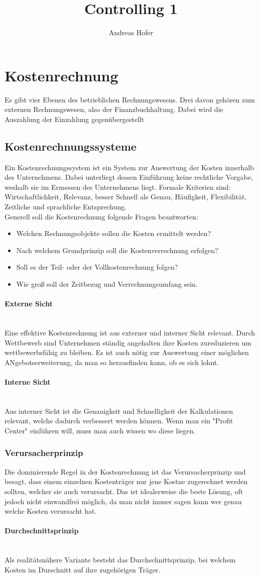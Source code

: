 \documentclass{article}
\title{\vspace{-1cm}Controlling 1}
\author{Andreas Hofer}
\newcommand{\paragraphlb}[1]{\paragraph{#1}\mbox{}\\}
\begin{document}
	\maketitle
	\tableofcontents
	\section{Kostenrechnung}
	Es gibt vier Ebenen des betrieblichen Rechnungswesens. Drei davon gehören zum externen Rechnungswesen, also der Finanzbuchhaltung. Dabei wird die Auszahlung der Einzahlung gegenübergestellt
	\subsection{Kostenrechnungssysteme}
	Ein Kostenrechnungssystem ist ein System zur Auswertung der Kosten innerhalb des Unternehmens. Dabei unterliegt dessen Einführung keine rechtliche Vorgabe, weshalb sie im Ermessen des Unternehmens liegt. Formale Kriterien sind: Wirtschaftlichkeit, Relevanz, besser Schnell als Genau, Häufigkeit, Flexibilität, Zeitliche und sprachliche Entsprechung. \\
	Generell soll die Kostenrechnung folgende Fragen beantworten:
	\begin{itemize}
		\item{Welchen Rechnungsobjekte sollen die Kosten ermittelt werden?}
		\item{Nach welchem Grundprinzip soll die Kostenverrechnung erfolgen?}
		\item{Soll es der Teil- oder der Vollkostenrechnung folgen?}
		\item{Wie groß soll der Zeitbezug und Verrechnungsumfang sein.}
	\end{itemize}
	\paragraphlb{Externe Sicht}
	Eine effektive Kostenrechnung ist aus externer und interner Sicht relevant. Durch Wettbewerb sind Unternehmen ständig angehalten ihre Kosten zureduzieren um wettbewerbsfähig zu bleiben. Es ist auch nötig zur Auswertung einer möglichen ANgebotserweiterung, da man so herausfinden kann, ob es sich lohnt.
	\paragraphlb{Interne Sicht}
	Aus interner Sicht ist die Genauigkeit und Schnelligkeit der Kalkulationen relevant, welche dadurch verbessert werden können. Wenn man ein "Profit Center" einführen will, muss man auch wissen wo diese liegen.
	\subsubsection{Verursacherprinzip}
	Die dominierende Regel in der Kostenrechnung ist das Verursacherprinzip und besagt, dass einem einzelnen Kostenträger nur jene Kostne zugerechnet werden sollten, welcher sie auch verursacht. Das ist idealerweise die beste Lösung, oft jedoch nicht einwandfrei möglich, da man nicht immer sagen kann wer genau welche Kosten verursacht hat.
	\paragraphlb{Durchschnittsprinzip}
	Als realitätsnähere Variante besteht das Durchschnittsprinzip, bei welchem Kosten im Durschnitt auf ihre zugehörigen Träger.
\end{document}
